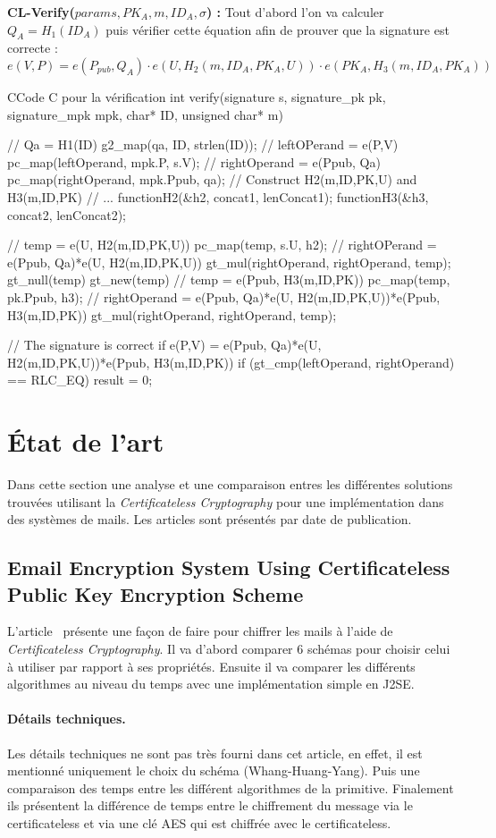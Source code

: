 \textbf{CL-Verify($params, PK_A,  m, ID_A, \sigma$) :} Tout d'abord l'on va calculer $Q_A = H_1(ID_A)$ puis vérifier cette équation afin de prouver que la signature est correcte :
\[e(V,P) = e(P_{pub}, Q_A) \cdot e(U, H_2(m, ID_A, PK_A,U)) \cdot e(PK_A, H_3(m, ID_A, PK_A)) \]

\begin{sourcebox}{C}{Code C pour la vérification}
	int verify(signature s, signature_pk pk, signature_mpk mpk, char* ID, unsigned char* m){
		// Qa = H1(ID)
		g2_map(qa, ID, strlen(ID));
		// leftOPerand = e(P,V)
		pc_map(leftOperand, mpk.P, s.V);
		// rightOperand = e(Ppub, Qa)
		pc_map(rightOperand, mpk.Ppub, qa);
		// Construct H2(m,ID,PK,U) and H3(m,ID,PK)
		// ...
		functionH2(&h2, concat1, lenConcat1);
		functionH3(&h3, concat2, lenConcat2);
		
		// temp = e(U, H2(m,ID,PK,U))
		pc_map(temp, s.U, h2);
		// rightOPerand = e(Ppub, Qa)*e(U, H2(m,ID,PK,U))
		gt_mul(rightOperand, rightOperand, temp);
		gt_null(temp)
		gt_new(temp)
		// temp = e(Ppub, H3(m,ID,PK))
		pc_map(temp, pk.Ppub, h3);
		// rightOperand = e(Ppub, Qa)*e(U, H2(m,ID,PK,U))*e(Ppub, H3(m,ID,PK))
		gt_mul(rightOperand, rightOperand, temp);
		
		// The signature is correct if e(P,V) = e(Ppub, Qa)*e(U, H2(m,ID,PK,U))*e(Ppub, H3(m,ID,PK))
		if (gt_cmp(leftOperand, rightOperand) == RLC_EQ) {
			result = 0;
		}
	}
\end{sourcebox}

\section{État de l'art}
Dans cette section une analyse et une comparaison entres les différentes solutions trouvées utilisant la \textit{Certificateless Cryptography} pour une implémentation dans des systèmes de mails. Les articles sont présentés par date de publication. 

\subsection{Email Encryption System Using Certificateless Public Key Encryption Scheme}
L'article~\cite{DBLP:conf/itcs2/ErYTG12} présente une façon de faire pour chiffrer les mails à l'aide de \textit{Certificateless Cryptography}. Il va d'abord comparer 6 schémas pour choisir celui à utiliser par rapport à ses propriétés. Ensuite il va comparer les différents algorithmes au niveau du temps avec une implémentation simple en J2SE. 
\paragraph*{Détails techniques.} Les détails techniques ne sont pas très fourni dans cet article, en effet, il est mentionné uniquement le choix du schéma (Whang-Huang-Yang). Puis une comparaison des temps entre les différent algorithmes de la primitive. Finalement ils présentent la différence de temps entre le chiffrement du message via le certificateless et via une clé AES qui est chiffrée avec le certificateless.
